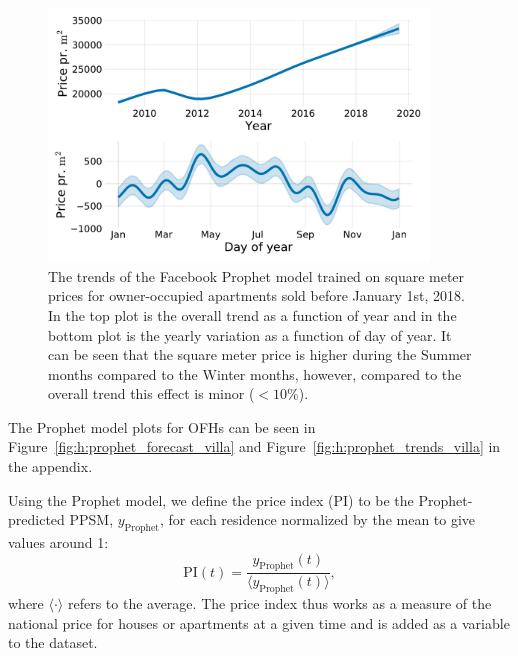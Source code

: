\begin{figure}
  \includegraphics[draft=false, width=0.9\textwidth, trim=15 15 15 15, clip]{figures/housing/Ejerlejlighed_v18_cut_all_Ncols_all_prophet_trends.pdf}
  \caption[Prophet Trends]
          {The trends of the Facebook Prophet model trained on square meter prices for owner-occupied apartments sold before January 1st, 2018. In the top plot is the overall trend as a function of year and in the bottom plot is the yearly variation as a function of day of year. It can be seen that the square meter price is higher during the Summer months compared to the Winter months, however, compared to the overall trend this effect is minor ($<10\%$). 
          }
  \label{fig:h:prophet_trends}
\end{figure}

The Prophet model plots for OFHs can be seen in Figure~\ref{fig:h:prophet_forecast_villa} and Figure~\ref{fig:h:prophet_trends_villa} in the appendix. 

Using the Prophet model, we define the price index (PI) to be the Prophet-predicted PPSM, $y_\mathrm{Prophet}$, for each residence normalized by the mean to give values around \num{1}:
\begin{equation}
  \mathrm{PI}(t) = \frac{y_\mathrm{Prophet}(t)}{\langle y_\mathrm{Prophet}(t) \rangle},
\end{equation}
where $\langle \boldsymbol{\cdot} \rangle$ refers to the average. The price index thus works as a measure of the national price for houses or apartments at a given time and is added as a variable to the dataset. 


